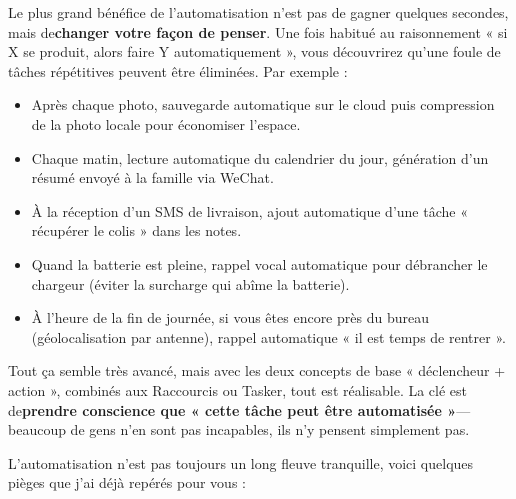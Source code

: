 
Le plus grand bénéfice de l’automatisation n’est pas de gagner quelques secondes, mais de\textbf{changer votre façon de penser}. Une fois habitué au raisonnement « si X se produit, alors faire Y automatiquement », vous découvrirez qu’une foule de tâches répétitives peuvent être éliminées. Par exemple :

\begin{itemize}
  \item Après chaque photo, sauvegarde automatique sur le cloud puis compression de la photo locale pour économiser l'espace.
  \item Chaque matin, lecture automatique du calendrier du jour, génération d'un résumé envoyé à la famille via WeChat.
  \item À la réception d'un SMS de livraison, ajout automatique d'une tâche « récupérer le colis » dans les notes.
  \item Quand la batterie est pleine, rappel vocal automatique pour débrancher le chargeur (éviter la surcharge qui abîme la batterie).
  \item À l'heure de la fin de journée, si vous êtes encore près du bureau (géolocalisation par antenne), rappel automatique « il est temps de rentrer ».
\end{itemize}

Tout ça semble très avancé, mais avec les deux concepts de base « déclencheur + action », combinés aux Raccourcis ou Tasker, tout est réalisable. La clé est de\textbf{prendre conscience que « cette tâche peut être automatisée »}— beaucoup de gens n’en sont pas incapables, ils n’y pensent simplement pas.


L'automatisation n'est pas toujours un long fleuve tranquille, voici quelques pièges que j'ai déjà repérés pour vous :

